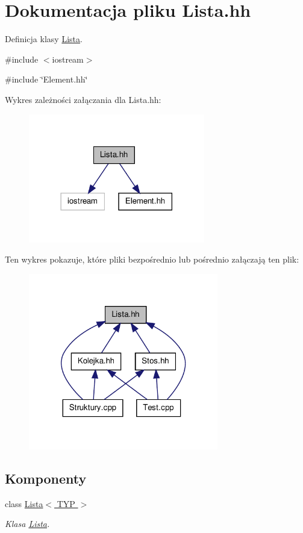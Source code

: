 \hypertarget{_lista_8hh}{
\section{Dokumentacja pliku Lista.hh}
\label{_lista_8hh}
}


Definicja klasy \hyperlink{class_lista}{Lista}.  


{\ttfamily \#include $<$iostream$>$}\par
{\ttfamily \#include \char`\"{}Element.hh\char`\"{}}\par
Wykres zależności załączania dla Lista.hh:
\nopagebreak
\begin{figure}[H]
\begin{center}
\leavevmode
\includegraphics[width=218pt]{_lista_8hh__incl}
\end{center}
\end{figure}
Ten wykres pokazuje, które pliki bezpośrednio lub pośrednio załączają ten plik:
\nopagebreak
\begin{figure}[H]
\begin{center}
\leavevmode
\includegraphics[width=235pt]{_lista_8hh__dep__incl}
\end{center}
\end{figure}
\subsection*{Komponenty}
\begin{DoxyCompactItemize}
\item 
class \hyperlink{class_lista}{Lista$<$ TYP $>$}
\begin{DoxyCompactList}\small\item\em Klasa \hyperlink{class_lista}{Lista}. \item\end{DoxyCompactList}\end{DoxyCompactItemize}


